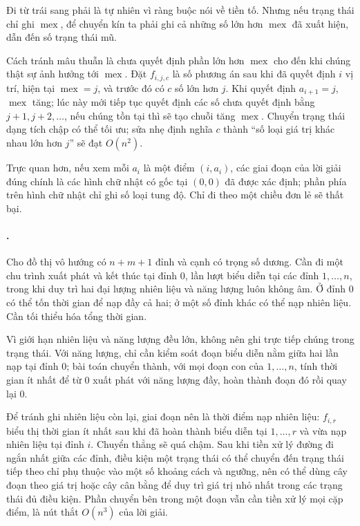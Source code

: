 \documentclass[11pt]{article}
\begin{document}
Đi từ trái sang phải là tự nhiên vì ràng buộc nói về tiền tố. Nhưng nếu trạng
thái chỉ ghi \(\operatorname{mex}\), để chuyển kín ta phải ghi cả những số lớn
hơn \(\operatorname{mex}\) đã xuất hiện, dẫn đến số trạng thái mũ.

Cách tránh mâu thuẫn là chưa quyết định phần lớn hơn \(\operatorname{mex}\) cho
đến khi chúng thật sự ảnh hưởng tới \(\operatorname{mex}\). Đặt \(f_{i,j,c}\)
là số phương án sau khi đã quyết định \(i\) vị trí, hiện tại
\(\operatorname{mex}=j\), và trước đó có \(c\) số lớn hơn \(j\). Khi quyết định
\(a_{i+1}=j\), \(\operatorname{mex}\) tăng; lúc này mới tiếp tục quyết định các
số chưa quyết định bằng \(j+1,j+2,\ldots\), nếu chúng tồn tại thì sẽ tạo chuỗi
tăng \(\operatorname{mex}\). Chuyển trạng thái dạng tích chập có thể tối ưu;
sửa nhẹ định nghĩa \(c\) thành ``số loại giá trị khác nhau lớn hơn \(j\)'' sẽ
đạt \(O(n^2)\).

Trực quan hơn, nếu xem mỗi \(a_i\) là một điểm \((i,a_i)\), các giai đoạn của
lời giải đúng chính là các hình chữ nhật có gốc tại \((0,0)\) đã được xác định;
phần phía trên hình chữ nhật chỉ ghi số loại tung độ. Chỉ đi theo một chiều đơn
lẻ sẽ thất bại.

\paragraph{.}
Cho đồ thị vô hướng có \(n+m+1\) đỉnh và cạnh có trọng số dương. Cần đi một
chu trình xuất phát và kết thúc tại đỉnh \(0\), lần lượt biểu diễn tại các đỉnh
\(1,\ldots,n\), trong khi duy trì hai đại lượng nhiên liệu và năng lượng luôn
không âm. Ở đỉnh \(0\) có thể tốn thời gian để nạp đầy cả hai; ở một số đỉnh
khác có thể nạp nhiên liệu. Cần tối thiểu hóa tổng thời gian.

Vì giới hạn nhiên liệu và năng lượng đều lớn, không nên ghi trực tiếp chúng
trong trạng thái. Với năng lượng, chỉ cần kiểm soát đoạn biểu diễn nằm giữa hai
lần nạp tại đỉnh \(0\); bài toán chuyển thành, với mọi đoạn con của
\(1,\ldots,n\), tính thời gian ít nhất để từ \(0\) xuất phát với năng lượng đầy,
hoàn thành đoạn đó rồi quay lại \(0\).

Để tránh ghi nhiên liệu còn lại, giai đoạn nên là thời điểm nạp nhiên liệu:
\(f_{i,r}\) biểu thị thời gian ít nhất sau khi đã hoàn thành biểu diễn tại
\(1,\ldots,r\) và vừa nạp nhiên liệu tại đỉnh \(i\). Chuyển thẳng sẽ quá chậm.
Sau khi tiền xử lý đường đi ngắn nhất giữa các đỉnh, điều kiện một trạng thái
có thể chuyển đến trạng thái tiếp theo chỉ phụ thuộc vào một số khoảng cách và
ngưỡng, nên có thể dùng cây đoạn theo giá trị hoặc cây cân bằng để duy trì giá
trị nhỏ nhất trong các trạng thái đủ điều kiện. Phần chuyển bên trong một đoạn
vẫn cần tiền xử lý mọi cặp điểm, là nút thắt \(O(n^3)\) của lời giải.
\end{document}
